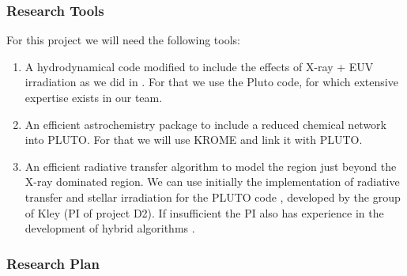 \documentclass[10pt,fleqn,twoside]{article}
\begin{document}
\subsubsection{Research Tools}

For this project we will need the following tools: 
\begin{enumerate}
\item A hydrodynamical code modified to include the
  effects of X-ray + EUV irradiation as we did in 
  \citet{2010MNRAS.401.1415O}.
  For
  that we use the Pluto code, for which extensive expertise
  exists in our team. 
\item An efficient astrochemistry package to include a reduced
  chemical network into PLUTO. For that we will use KROME 
  \citep{2014MNRAS.439.2386G}
and link it with PLUTO. 
\item An efficient radiative transfer algorithm to model the region
  just beyond the X-ray dominated region. We can use initially the
  implementation of radiative transfer and stellar irradiation
for the PLUTO code 
\citep{2013A&A...559A..80K},
developed by the group of Kley
(PI of project D2). If insufficient the PI also has experience in the
development of hybrid algorithms  
\citep{2014ASSP...36..127O}.

\end{enumerate}

\subsubsection{Research Plan} 
\end{document}
